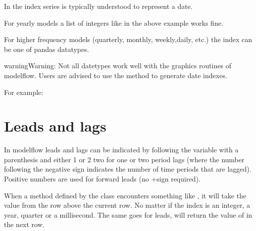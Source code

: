 \documentclass[letterpaper,10pt,english]{jupyterBook}
\begin{document}
\sphinxAtStartPar
In  the index series is typically understood to represent a date.

\sphinxAtStartPar
For yearly models a list of integers like in the above example works fine.

\sphinxAtStartPar
For higher frequency models (quarterly, monthly, weekly,daily, etc.) the index can be one of pandas datatypes.

\begin{sphinxadmonition}{warning}{Warning:}
\sphinxAtStartPar
Not all datetypes work well with the graphics routines of modelflow.  Users are advised to use the  method to generate date indexes.

\sphinxAtStartPar
For example:

\begin{sphinxVerbatim}[commandchars=\\\{\}]
      
\end{sphinxVerbatim}
\end{sphinxadmonition}


\section{Leads and lags}
\label{\detokenize{content/04_PythonEssentials/UpdateCommand:leads-and-lags}}
\sphinxAtStartPar
In modelflow leads and lags can be indicated by following the variable with a parenthesis and either \sphinxhyphen{}1 or \sphinxhyphen{}2 two for one or two period lags (where the number following the negative sign indicates the number of time periods that are lagged). Positive numbers are used for forward leads (no +sign required).

\sphinxAtStartPar
When a method defined by the  class encounters something like , it will take the value from the row above the current row. No matter if the index is an integer, a year, quarter or a millisecond. The same goes for leads,  will return the value of  in the next row.
\end{document}
